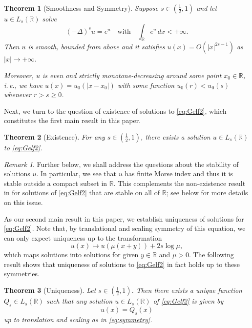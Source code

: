 \documentclass[reqno,10pt,a4paper]{amsart}
\newtheorem{thm}{Theorem}[section]
\theoremstyle{definition}
\theoremstyle{definition}
\theoremstyle{remark}
\theoremstyle{remark}
\newtheorem*{remark*}{Remark}
\numberwithin{equation}{section}
\newcommand{\R}{\mathbb{R}}
\newcommand{\be}{\begin{equation}}
\newcommand{\ee}{\end{equation}}
\newcommand{\Ds}{(-\Delta)^{s}}
\begin{document}
\begin{thm}[Smoothness and Symmetry] \label{thm:reg_sym}
Suppose $s \in (\frac 1 2, 1)$ and let $u \in L_s(\R)$ solve
\be \label{eq:Gelf2}
\Ds u = e^u \quad \mbox{with} \quad \int_\R e^u \, dx < +\infty.
\ee
Then $u$ is smooth, bounded from above and it satisfies $u(x) = O(|x|^{2s-1})$ as $|x| \to +\infty$. 

Moreover, $u$ is even and strictly monotone-decreasing around some point $x_0 \in \R$, i.\,e., we have $u(x) = u_0(|x-x_0|)$ with some function $u_0(r) < u_0(s)$ whenever $r > s \geq 0$.
\end{thm}

Next, we turn to the question of existence of solutions to \eqref{eq:Gelf2}, which constitutes the first main result in this paper.

\begin{thm}[Existence] \label{thm:existence}
For any $s \in (\frac 1 2, 1)$, there exists a solution $u \in L_s(\R)$ to \eqref{eq:Gelf2}.
\end{thm}

\begin{remark*}
Further below, we shall address the questions about the stability of solutions $u$. In particular, we see that $u$ has finite Morse index and thus it is stable outside a compact subset in $\R$. This complements the non-existence result in \cite{DuNg-22} for solutions of \eqref{eq:Gelf2} that are stable on all of $\R$; see below for more details on this issue. 
\end{remark*}

As our second main result in this paper, we  establish uniqueness of solutions for \eqref{eq:Gelf2}. Note that, by translational and scaling symmetry of this equation, we can only expect uniqueness up to the transformation
\be \label{eq:symmetry}
u(x) \mapsto u\left (\mu(x+y) \right ) + 2 s \log \mu ,
\ee 
which maps solutions into solutions for given $y \in \R$ and $\mu > 0$. The following result shows that uniqueness of solutions to \eqref{eq:Gelf2} in fact holds up to these symmetries. 

\begin{thm}[Uniqueness]  \label{thm:unique}
Let $s \in (\frac 1 2, 1)$. Then there exists a unique function $Q_s \in L_s(\R)$ such that any solution $u \in L_s(\R)$ of \eqref{eq:Gelf2} is given by 
$$
u(x) = Q_s(x)
$$ 
up to translation and scaling as in \eqref{eq:symmetry}.  
\end{thm}
\end{document}

